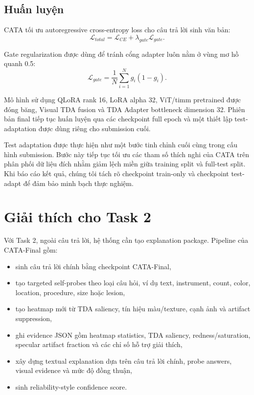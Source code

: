 \documentclass[11pt,a4paper]{article}
\begin{document}
\subsection{Huấn luyện}

CATA tối ưu autoregressive cross-entropy loss cho câu trả lời sinh văn bản:
\begin{equation}
\mathcal{L}_{total} = \mathcal{L}_{CE} + \lambda_{gate}\mathcal{L}_{gate}.
\end{equation}

Gate regularization được dùng để tránh cổng adapter luôn nằm ở vùng mơ hồ quanh 0.5:
\begin{equation}
\mathcal{L}_{gate} = \frac{1}{N}\sum_{i=1}^{N} g_i(1-g_i).
\end{equation}

Mô hình sử dụng QLoRA rank 16, LoRA alpha 32, ViT/timm pretrained được đóng băng, Visual TDA fusion và TDA Adapter bottleneck dimension 32. Phiên bản final tiếp tục huấn luyện qua các checkpoint full epoch và một thiết lập test-adaptation được dùng riêng cho submission cuối.

Test adaptation được thực hiện như một bước tinh chỉnh cuối cùng trong cấu hình submission. Bước này tiếp tục tối ưu các tham số thích nghi của CATA trên phân phối dữ liệu đích nhằm giảm lệch miền giữa training split và full-test split. Khi báo cáo kết quả, chúng tôi tách rõ checkpoint train-only và checkpoint test-adapt để đảm bảo minh bạch thực nghiệm.

\section{Giải thích cho Task 2}

Với Task 2, ngoài câu trả lời, hệ thống cần tạo explanation package. Pipeline của CATA-Final gồm:
\begin{itemize}
    \item sinh câu trả lời chính bằng checkpoint CATA-Final,
    \item tạo targeted self-probes theo loại câu hỏi, ví dụ text, instrument, count, color, location, procedure, size hoặc lesion,
    \item tạo heatmap mới từ TDA saliency, tín hiệu màu/texture, cạnh ảnh và artifact suppression,
    \item ghi evidence JSON gồm heatmap statistics, TDA saliency, redness/saturation, specular artifact fraction và các chỉ số hỗ trợ giải thích,
    \item xây dựng textual explanation dựa trên câu trả lời chính, probe answers, visual evidence và mức độ đồng thuận,
    \item sinh reliability-style confidence score.
\end{itemize}
\end{document}

